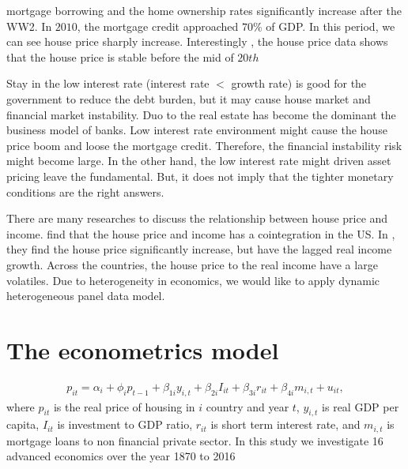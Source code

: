 \documentclass[12pt,a4paper,hyperref]{article}
\begin{document}
\citet{Jorda:2015} mortgage borrowing and the home ownership rates significantly increase after the WW2. In $2010$, the mortgage credit approached $70\%$ of GDP. In this period, we can see house price sharply increase. Interestingly , the house price data shows that the house price is stable before the mid of $20th$


Stay in the low interest rate (interest rate $<$ growth rate) is good for the government to reduce the debt burden, but it may cause house market and financial market instability. Duo to the real estate has become the dominant the business model of banks. Low interest rate environment might cause the house price boom and loose the mortgage credit. Therefore, the financial instability risk might become large.
In the other hand, the low interest rate might driven asset pricing leave the fundamental. But, it does not imply that the tighter monetary conditions are the right answers.

There are many researches to discuss the relationship between house price and income. \citet{Sean:2010} find that the house price and income has a cointegration in the US. In \citet{Knoll:2017}, they find the house price significantly increase, but have the lagged real income growth. Across the countries, the house price to the real income have a large volatiles. Due to heterogeneity in economics, we would like to apply dynamic heterogeneous panel data model.


\section{The econometrics model}
\begin{align}
p_{it}=\alpha_{i}+\phi_{i} p_{t-1}+\beta_{1i}y_{i,t}+ \beta_{2i}I_{it}+\beta_{3i} r_{it}+\beta_{4i} m_{i,t}+u_{it},
\end{align}
where $p_{it}$ is the real price of housing in $i$ country and year $t$, $y_{i,t}$ is real GDP per capita, $I_{it}$ is investment to GDP ratio, $r_{it}$ is short term interest rate, and $m_{i,t}$  is mortgage loans to non financial private sector.
In this study we investigate 16 advanced economics over the year 1870 to 2016


\renewcommand\refname{References}


\end{document}
